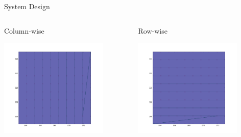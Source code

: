 \documentclass[9pt]{beamer}
\begin{document}
\begin{frame}{System Design}
    \begin{columns}
         \begin{column}{0.45\textwidth}
             \begin{block}{Column-wise}   
                 \begin{center}
                     \includegraphics[width=0.8\textwidth,trim={4cm 3cm 0cm 0cm},clip]{img/EXP2RC1-0_col.png}
                 \end{center}
             \end{block} 
        \end{column}
        \begin{column}{0.45\textwidth}
             \begin{block}{Row-wise}   
                 \begin{center}
                     \includegraphics[width=0.8\textwidth,trim={4cm 3cm 0cm 0cm},clip]{img/EXP2RC1-0_row.png}
                 \end{center}
             \end{block} 
        \end{column}
    \end{columns}
\end{frame}
\end{document}
